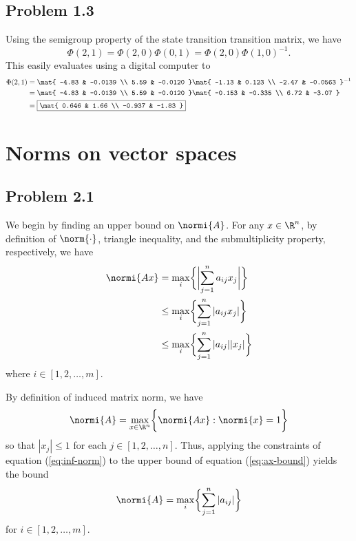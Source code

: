 \documentclass{homework}
\begin{document}
\subsection{Problem 1.3}
Using the semigroup property of the state transition transition matrix, we have
\begin{equation}
    \Phi(2,1) = \Phi(2, 0)\Phi(0, 1) = \Phi(2, 0)\Phi(1, 0)^{-1}.
\end{equation}
This easily evaluates using a digital computer to
\begin{align*}
    \Phi(2, 1) &= \mat{
        -4.83 & -0.0139  \\
        5.59 & -0.0120
    } \mat{
        -1.13 & 0.123  \\
        -2.47 & -0.0563
    }^{-1} \\
    &= \mat{
        -4.83 & -0.0139  \\
        5.59 & -0.0120
    } \mat{
        -0.153 & -0.335  \\
        6.72 & -3.07
    } \\
    &= \boxed{\mat{
        0.646 & 1.66  \\
        -0.937 & -1.83
    }}
\end{align*}

\section{Norms on vector spaces}
\subsection{Problem 2.1}
We begin by finding an upper bound on $\normi{A}$. 
For any $x\in\R^n$, by definition of $\norm{\cdot}$,
triangle inequality, and the submultiplicity property, respectively,
we have
\begin{align}
    \normi{Ax} &= \max_i \biggl\{
        \biggl\rvert \sum_{j=1}^{n}  a_{ij}x_j \biggr\rvert
    \biggr\} \\
    &\leq \max_i \biggl\{
        \sum_{j=1}^{n}  | a_{ij}x_j |
    \biggr\} \\
    &\leq \max_i \biggl\{
        \sum_{j=1}^{n}  | a_{ij}||x_j |
    \biggr\}
    \label{eq:ax-bound}
\end{align}
where $i\in[1, 2, \dots, m]$.

By definition of induced matrix norm, we have
\begin{equation}
    \normi{A} = \max_{x\in\R^n} \biggl\{
        \normi{Ax}: \normi{x} = 1
    \biggr\}
    \label{eq:inf-norm}
\end{equation}
so that $|x_j|\leq 1$ for each $j\in[1,2,\dots,n]$. 
Thus, applying the constraints of equation (\ref{eq:inf-norm})
to the upper bound of equation (\ref{eq:ax-bound}) yields
the bound
\begin{equation}
    \normi{A} = \max_i \biggl\{
        \sum_{j=1}^n |a_{ij}|
    \biggr\}
    \label{eq:norm-upper-bound}
\end{equation}
for $i\in[1, 2, \dots,m]$.
\end{document}
